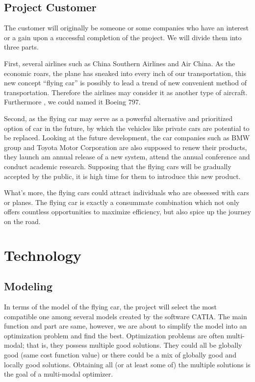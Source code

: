 \subsection{Project Customer}

The customer will originally be someone or some companies who have an interest or a gain upon a successful completion of the project. We will divide them into three parts.

First, several airlines such as China Southern Airlines and Air China. As the economic roars, the plane has sneaked into every inch of our transportation, this new concept “flying car” is possibly to lead a trend of new convenient method of transportation. Therefore the airlines may consider it as another type of aircraft. Furthermore , we could named it Boeing 797.

Second, as the flying car may serve as a powerful alternative and prioritized option of car in the future, by which the vehicles like private cars are potential to be replaced. Looking at the future development, the car companies such as BMW group and Toyota Motor Corporation are also supposed to renew their products, they launch am annual release of a new system, attend the annual conference and conduct academic research. Supposing that the flying cars will be gradually accepted by the public, it is high time for them to introduce this new product.

What’s more, the flying cars could attract individuals who are obsessed with cars or planes. The flying car is exactly a consummate combination which not only offers countless opportunities to maximize efficiency, but also spice up the journey on the road.


\section{Technology}

\subsection{Modeling}

In terms of the model of the flying car, the project will select the most compatible one among several models created by the software CATIA. The main function and part are same, however, we are about to simplify the model into an optimization problem and find the best. Optimization problems are often multi-modal; that is, they possess multiple good solutions. They could all be globally good (same cost function value) or there could be a mix of globally good and locally good solutions. Obtaining all (or at least some of) the multiple solutions is the goal of a multi-modal optimizer. 


